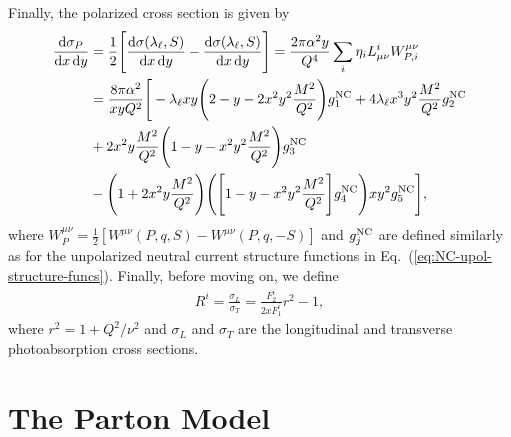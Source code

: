 \documentclass[aps,prd,amsmath,superscriptaddress,floatfix,nofootinbib]{revtex4-2}
\newcommand{\diff}[1]{{\rm d} #1}
\newcommand{\eref}[1]{Eq.~(\ref{eq:#1})}
\begin{document}
Finally, the polarized cross section is given by 
\begin{eqnarray}
    \label{eq:pol-xsec}
    \begin{aligned}    
        \frac{\diff \sigma_{P}}{\diff x \, \diff y} &= \frac{1}{2} \Bigg[ \frac{\diff \sigma(\lambda_{\ell},S)}{\diff x \, \diff y} - \frac{\diff \sigma(\lambda_{\ell},S)}{\diff x \, \diff y} \Bigg] = \frac{2 \pi \alpha^2 y}{Q^{4}} \sum_{i} \eta_{i} L_{\mu\nu}^{i} W^{\mu\nu}_{P,i} \\
        &= \frac{8 \pi \alpha^2}{x y Q^2} \Bigg[ -\lambda_{\ell} xy \Bigg( 2 - y - 2x^2y^2 \frac{M^2}{Q^2} \Bigg) g_1^{\rm NC} + 4 \lambda_{\ell} x^3 y^2 \frac{M^2}{Q^2} g_2^{\rm NC} \\
        &+ 2x^2y \frac{M^2}{Q^2} \Bigg( 1 - y - x^2y^2 \frac{M^2}{Q^2} \Bigg) g_3^{\rm NC} \\
        &- \Bigg( 1 + 2x^2y \frac{M^2}{Q^2} \Bigg) \Bigg( \Bigg[ 1 - y - x^2y^2 \frac{M^2}{Q^2} \Bigg] g_4^{\rm NC} \Bigg) xy^2 g_5^{\rm NC} \Bigg]
    ,\end{aligned}
\end{eqnarray}
where $W^{\mu\nu}_{P} = \frac{1}{2} [ W^{\mu\nu}(P,q,S) - W^{\mu\nu}(P,q,-S) ]$ and $g^{\rm NC}_{j}$ are defined similarly as for the unpolarized neutral current structure functions in \eref{NC-upol-structure-funcs}.
Finally, before moving on, we define
\begin{eqnarray}
    \label{eq:ratio}
    R^{i} = \frac{\sigma_{L}}{\sigma_{T}} = \frac{F_{2}^{i}}{2xF_{1}^{i}} r^2 - 1
,\end{eqnarray}
where $r^2 = 1 + Q^2/\nu^2$ and $\sigma_{L}$ and $\sigma_{T}$ are the longitudinal and transverse photoabsorption cross sections.


\section{The Parton Model}
\label{sec:the-naive-parton-model}
\end{document}
